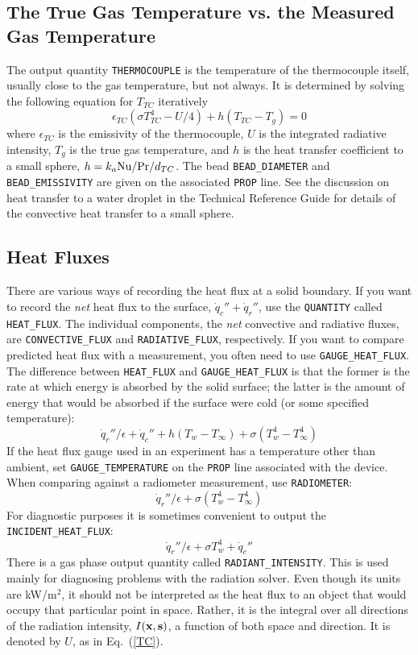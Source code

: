 \documentclass[11pt]{book}
\newcommand{\ct}{\tt\small}
\newcommand{\bx}{{\bf x}}
\newcommand{\bs}{{\bf s}}
\newcommand{\dq}{\dot{q}}
\newcommand{\be}{\begin{equation}}
\newcommand{\ee}{\end{equation}}
\newcommand{\PR}{\hbox{Pr}}
\newcommand{\NU}{\hbox{Nu}}
\begin{document}
\subsection{The True Gas Temperature vs. the Measured Gas Temperature}
\label{info:THERMOCOUPLE}

The output quantity {\ct THERMOCOUPLE} is the temperature
of the thermocouple itself, usually close to the gas temperature, but not
always. It is determined by solving the following equation
for $T_{TC}$ iteratively~\cite{Welsh:1}
\be \epsilon_{TC} (\sigma T_{TC}^4- U/4) + h(T_{TC}-T_g) = 0 \label{TC}  \ee
where $\epsilon_{TC}$ is the emissivity of the thermocouple, $U$ is the
integrated radiative intensity, $T_g$ is the true gas temperature, and
$h$ is the heat transfer coefficient to a small sphere,
$h=k_a \NU/\PR/d_{TC}$. The bead {\ct BEAD\_DIAMETER} and {\ct BEAD\_EMISSIVITY} are given on the associated {\ct PROP} line.
See the discussion on heat transfer to a water
droplet in the Technical Reference Guide for details of the convective
heat transfer to a small sphere.


\subsection{Heat Fluxes}
\label{info:heat_flux}

There are various ways of recording the heat flux at a solid boundary. If you want to record the {\em net} heat flux to
the surface, $\dq_c'' + \dq_r''$, use the {\ct QUANTITY} called {\ct HEAT\_FLUX}. The individual components, the {\em net}
convective and radiative fluxes, are {\ct CONVECTIVE\_FLUX} and {\ct RADIATIVE\_FLUX}, respectively. If you want to compare
predicted heat flux with a measurement, you often need to use {\ct GAUGE\_HEAT\_FLUX}.
The difference between {\ct HEAT\_FLUX} and {\ct GAUGE\_HEAT\_FLUX} is that
the former is the rate at which energy is absorbed by the solid surface;
the latter is the amount of energy that would be absorbed if the surface were cold (or some specified temperature):
$$\dq_r''/\epsilon +\dq_c'' + h(T_w-T_\infty) + \sigma (T_w^4-T_\infty^4)$$
If the heat flux gauge used in an experiment has
a temperature other than ambient, set {\ct GAUGE\_TEMPERATURE} on the {\ct PROP} line associated with the device.
When comparing against a radiometer measurement, use {\ct RADIOMETER}:
$$\dq_r''/\epsilon + \sigma (T_w^4-T_\infty^4) $$
For diagnostic purposes it is sometimes convenient to output the {\ct INCIDENT\_HEAT\_FLUX}:
$$ \dq_r''/\epsilon + \sigma T_w^4 +\dq_c'' $$
There is a gas phase output quantity called {\ct RADIANT\_INTENSITY}. This is used mainly for diagnosing problems with the
radiation solver. Even though its units are kW/m$^2$, it should not be interpreted as the heat flux to an object that would
occupy that particular point in space. Rather, it is the integral over all directions of the radiation intensity, $I(\bx,\bs)$, a function of both
space and direction. It is denoted by $U$, as in Eq.~(\ref{TC}).
\end{document}
